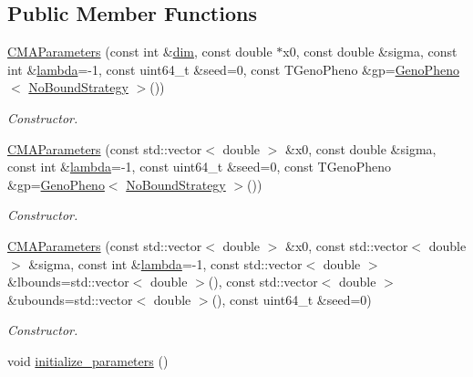 \subsection*{Public Member Functions}
\begin{DoxyCompactItemize}
\item 
\hyperlink{classlibcmaes_1_1CMAParameters_a18d6039c0adffddd51caee1250b072bc}{C\-M\-A\-Parameters} (const int \&\hyperlink{classlibcmaes_1_1Parameters_a95a3c04400a77d134bb1e9705189a24e}{dim}, const double $\ast$x0, const double \&sigma, const int \&\hyperlink{classlibcmaes_1_1Parameters_a3d569987e9a5eb61bc781ee75b2ab18a}{lambda}=-\/1, const uint64\-\_\-t \&seed=0, const T\-Geno\-Pheno \&gp=\hyperlink{classlibcmaes_1_1GenoPheno}{Geno\-Pheno}$<$ \hyperlink{classlibcmaes_1_1NoBoundStrategy}{No\-Bound\-Strategy} $>$())
\begin{DoxyCompactList}\small\item\em Constructor. \end{DoxyCompactList}\item 
\hyperlink{classlibcmaes_1_1CMAParameters_a676e688fd58f9244886270f32cbad47e}{C\-M\-A\-Parameters} (const std\-::vector$<$ double $>$ \&x0, const double \&sigma, const int \&\hyperlink{classlibcmaes_1_1Parameters_a3d569987e9a5eb61bc781ee75b2ab18a}{lambda}=-\/1, const uint64\-\_\-t \&seed=0, const T\-Geno\-Pheno \&gp=\hyperlink{classlibcmaes_1_1GenoPheno}{Geno\-Pheno}$<$ \hyperlink{classlibcmaes_1_1NoBoundStrategy}{No\-Bound\-Strategy} $>$())
\begin{DoxyCompactList}\small\item\em Constructor. \end{DoxyCompactList}\item 
\hyperlink{classlibcmaes_1_1CMAParameters_aef4446010825fd81710a820743b31bd5}{C\-M\-A\-Parameters} (const std\-::vector$<$ double $>$ \&x0, const std\-::vector$<$ double $>$ \&sigma, const int \&\hyperlink{classlibcmaes_1_1Parameters_a3d569987e9a5eb61bc781ee75b2ab18a}{lambda}=-\/1, const std\-::vector$<$ double $>$ \&lbounds=std\-::vector$<$ double $>$(), const std\-::vector$<$ double $>$ \&ubounds=std\-::vector$<$ double $>$(), const uint64\-\_\-t \&seed=0)
\begin{DoxyCompactList}\small\item\em Constructor. \end{DoxyCompactList}\item 
\hypertarget{classlibcmaes_1_1CMAParameters_a0d963d4719d9b6447cddeeca542167a1}{void \hyperlink{classlibcmaes_1_1CMAParameters_a0d963d4719d9b6447cddeeca542167a1}{initialize\-\_\-parameters} ()}\label{classlibcmaes_1_1CMAParameters_a0d963d4719d9b6447cddeeca542167a1}


\end{DoxyCompactItemize}
